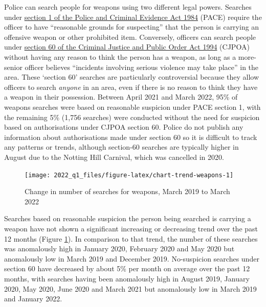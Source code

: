 \documentclass[
  a4paper,
  twoside, 11pt]{article}
\begin{document}
Police can search people for weapons using two different legal powers. Searches under \href{https://www.legislation.gov.uk/ukpga/1984/60/section/1}{section 1 of the Police and Criminal Evidence Act 1984} (PACE) require the officer to have ``reasonable grounds for suspecting'' that the person is carrying an offensive weapon or other prohibited item. Conversely, officers can search people under \href{https://www.legislation.gov.uk/ukpga/1994/33/section/60}{section 60 of the Criminal Justice and Public Order Act 1994} (CJPOA) without having any reason to think the person has a weapon, as long as a more-senior officer believes ``incidents involving serious violence may take place'' in the area. These `section 60' searches are particularly controversial because they allow officers to search \emph{anyone} in an area, even if there is no reason to think they have a weapon in their possession. Between April 2021 and March 2022, 95\% of weapons searches were based on reasonable suspicion under PACE section 1, with the remaining 5\% (1,756 searches) were conducted without the need for suspicion based on authorisations under CJPOA section 60. Police do not publish any information about authorisations made under section 60 so it is difficult to track any patterns or trends, although section-60 searches are typically higher in August due to the Notting Hill Carnival, which was cancelled in 2020.



\begin{figure}[tb]

{\centering \texttt{[image: 2022\_q1\_files/figure-latex/chart-trend-weapons-1]} 

}

\caption{Change in number of searches for weapons, March 2019 to March 2022}\label{fig:chart-trend-weapons}
\end{figure}

Searches based on reasonable suspicion the person being searched is carrying a weapon have not shown a significant increasing or decreasing trend over the past 12 months (Figure \ref{fig:chart-trend-weapons}). In comparison to that trend, the number of these searches was anomalously high in January 2020, February 2020 and May 2020 but anomalously low in March 2019 and December 2019.
No-suspicion searches under section 60 have decreased by about 5\% per month on average over the past 12 months, with searches having been anomalously high in August 2019, January 2020, May 2020, June 2020 and March 2021 but anomalously low in March 2019 and January 2022.
\end{document}
